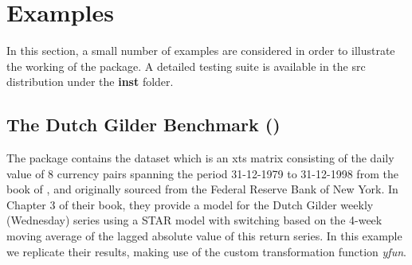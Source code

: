 \section{Examples}\label{sec:7}
In this section, a small number of examples are considered in order to
illustrate the working of the package. A detailed testing suite is available in
the src distribution under the \textbf{inst} folder.

\subsection{The Dutch Gilder Benchmark (\cite{Franses2000})}
The package contains the  dataset which is an xts matrix
consisting of the daily value of 8 currency pairs spanning the period
31-12-1979 to 31-12-1998 from the book of \cite{Franses2000}, and originally
sourced from the Federal Reserve Bank of New York. In Chapter 3 of their book,
they provide a model for the Dutch Gilder weekly (Wednesday) series using a
STAR model with switching based on the 4-week moving average of the lagged
absolute value of this return series. In this example we replicate their
results, making use of the custom transformation function \emph{yfun}.
